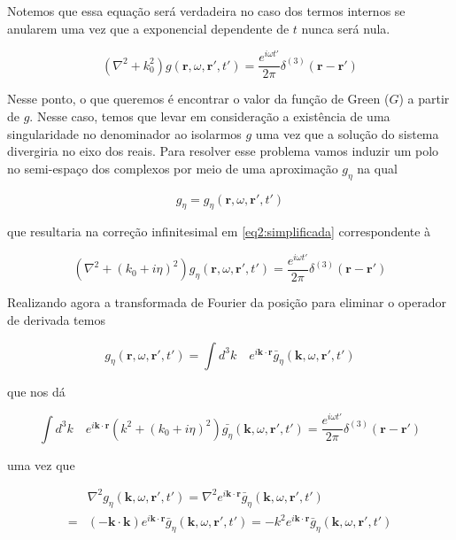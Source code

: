 Notemos que essa equação será verdadeira no caso dos termos internos se anularem uma vez que a exponencial dependente de $t$ nunca será nula.

\begin{equation}
	\left( \nabla^2 + k_0^2\right) g(\textbf{r},\omega, \textbf{r}', t') 
    = \frac{e^{i\omega t'}}{2\pi}\delta^{(3)}(\textbf{r}-\textbf{r}')
    \label{eq2:simplificada}
\end{equation}

Nesse ponto, o que queremos é encontrar o valor da função de Green ($G$) a partir de $g$. Nesse caso, temos que levar em consideração a existência de uma singularidade no denominador ao isolarmos $g$ uma vez que a solução do sistema divergiria no eixo dos reais. Para resolver esse problema vamos induzir um polo no semi-espaço dos complexos por meio de uma aproximação $g_\eta$ na qual

\begin{equation*}
	g_{\eta} = g_{\eta}(\textbf{r}, \omega, \textbf{r}', t')
\end{equation*}

que resultaria na correção infinitesimal em \ref{eq2:simplificada} correspondente à

\begin{equation}
	\left( \nabla^2 + (k_0+i\eta)^2\right) g_{\eta}(\textbf{r},\omega, \textbf{r}', t') 
	= \frac{e^{i\omega t'}}{2\pi}\delta^{(3)}(\textbf{r}-\textbf{r}')
\end{equation}

Realizando agora a transformada de Fourier da posição para eliminar o operador de derivada temos

\begin{equation}
	g_{\eta}(\textbf{r}, \omega, \textbf{r}', t') =
	\int d^3k \quad e^{i\textbf{k}\cdot\textbf{r}}\bar{g}_{\eta}(\textbf{k}, \omega, \textbf{r}', t')
\end{equation}

que nos dá

\begin{equation}
	\int d^3k \quad e^{i\textbf{k}\cdot\textbf{r}} \left( k^2 + (k_0+i\eta)^2\right) \bar{g_\eta}(\textbf{k},\omega, \textbf{r}', t') 
	= \frac{e^{i\omega t'}}{2\pi}\delta^{(3)}(\textbf{r}-\textbf{r}')
\end{equation}

uma vez que

\begin{equation}
	\begin{split}
	 & \nabla^2 g_{\eta}(\textbf{k}, \omega, \textbf{r}', t')
	= \nabla^2 e^{i\textbf{k}\cdot\textbf{r}}\bar{g}_{\eta}(\textbf{k}, \omega, \textbf{r}', t')\\
	= &(-\textbf{k}\cdot\textbf{k}) e^{i\textbf{k}\cdot\textbf{r}}\bar{g}_{\eta}(\textbf{k}, \omega, \textbf{r}', t')
	= -k^2 e^{i\textbf{k}\cdot\textbf{r}}\bar{g}_{\eta}(\textbf{k}, \omega, \textbf{r}', t')
	\end{split}
\end{equation}


